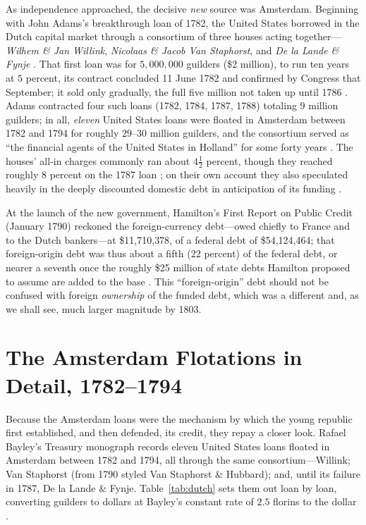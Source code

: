 \documentclass[12pt]{article}
\begin{document}
As independence approached, the decisive \emph{new} source was Amsterdam.
Beginning with John Adams's breakthrough loan of 1782, the United States
borrowed in the Dutch capital market through a consortium of three houses acting
together---\emph{Wilhem \& Jan Willink}, \emph{Nicolaas \& Jacob Van Staphorst},
and \emph{De la Lande \& Fynje} \citep{vanwinter1977american,
riley1980international}. That first loan was for $5{,}000{,}000$ guilders
(\$2 million), to run ten years at $5$ percent, its contract concluded 11 June
1782 and confirmed by Congress that September; it sold only gradually, the full
five million not taken up until 1786 \citep[311]{bayley1881national}. Adams
contracted four such loans (1782, 1784, 1787, 1788) totaling $9$ million
guilders; in all, \emph{eleven} United States loans were floated in Amsterdam
between 1782 and 1794 for roughly $29$--$30$ million guilders, and the
consortium served as ``the financial agents of the United States in Holland''
for some forty years \citep[311--317]{bayley1881national}. The houses' all-in
charges commonly ran about $4\tfrac{1}{2}$ percent, though they reached roughly
$8$ percent on the 1787 loan \citep[311--317]{bayley1881national}; on their own
account they also speculated heavily in the deeply discounted domestic debt in
anticipation of its funding \citep{syllawilsonwright2006}.

At the launch of the new government, Hamilton's First Report on Public Credit
(January 1790) reckoned the foreign-currency debt---owed chiefly to France and
to the Dutch bankers---at \$11{,}710{,}378, of a federal debt of
\$54{,}124{,}464; that foreign-origin debt was thus about a fifth ($22$ percent)
of the federal debt, or nearer a seventh once the roughly \$25 million of state
debts Hamilton proposed to assume are added to the base
\citep[12]{sylla2011financial}. This ``foreign-origin'' debt should not be
confused with foreign \emph{ownership} of the funded debt, which was a different
and, as we shall see, much larger magnitude by 1803.

\section{The Amsterdam Flotations in Detail, 1782--1794}
\label{sec:dutch}

Because the Amsterdam loans were the mechanism by which the young republic first
established, and then defended, its credit, they repay a closer look. Rafael
Bayley's Treasury monograph records eleven United States loans floated in
Amsterdam between 1782 and 1794, all through the same consortium---Willink; Van
Staphorst (from 1790 styled Van Staphorst \& Hubbard); and, until its failure in
1787, De la Lande \& Fynje. Table~\ref{tab:dutch} sets them out loan by loan,
converting guilders to dollars at Bayley's constant rate of $2.5$ florins to the
dollar \citep[310--321]{bayley1881national}.
\end{document}
